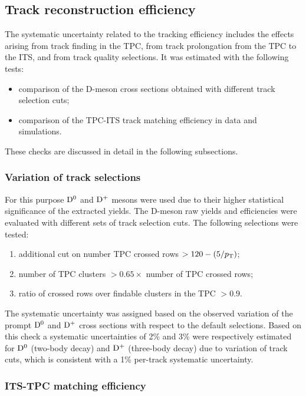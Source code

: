 \subsection{Track reconstruction efficiency}

The systematic uncertainty related to the tracking efficiency includes the 
effects arising from track finding in the TPC, from track prolongation  
from the TPC to the ITS, and from track quality selections.
It was estimated with the following tests:
\begin{itemize}
\item comparison of the D-meson cross sections obtained with different track selection cuts;
\item comparison of the TPC-ITS track matching efficiency in data and simulations.
\end{itemize}
These checks are discussed in detail in the following subsections.

\subsubsection{Variation of track selections}
For this purpose ${\rm D^0}$ and ${\rm D^+}$ mesons were used due to their
higher statistical significance of the extracted yields.
The D-meson raw yields and efficiencies were evaluated with 
different sets of track selection cuts.
The following selections were tested:
\begin{enumerate}
\item additional cut on number TPC crossed rows $> 120-(5/p_{\rm T})$;
\item number of TPC clusters $>0.65 \times$ number of TPC crossed rows;
\item ratio of crossed rows over findable clusters in the TPC $>0.9$.
\end{enumerate}
The systematic uncertainty was assigned based on the observed variation of
the prompt ${\rm D^0}$ and ${\rm D^+}$ cross sections with respect to the default selections.
Based on this check a systematic uncertainties of 2\% and 3\% were 
respectively estimated for ${\rm D^0}$ (two-body decay) and ${\rm D^+}$ (three-body decay) 
due to variation of track cuts, which is consistent with a 1\% per-track systematic
uncertainty.

\subsubsection{ITS-TPC matching efficiency}

